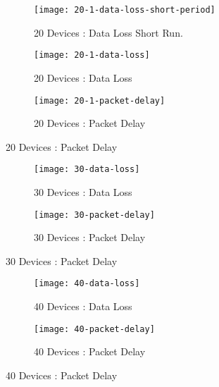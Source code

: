 \begin{center}
    \begin{figure}[p]
        \begin{subfigure}{1\textwidth}
            \centering
            \texttt{[image: 20-1-data-loss-short-period]}
            \caption{20 Devices : Data Loss Short Run.}
            \label{fig:20-D-DLSR}
        \end{subfigure}
        \begin{subfigure}{1\textwidth}
            \centering
            \texttt{[image: 20-1-data-loss]}
            \caption{20 Devices : Data Loss}
            \label{fig:20-D-DL}
        \end{subfigure}
        \begin{subfigure}{1\textwidth}
            \centering
            \texttt{[image: 20-1-packet-delay]}
            \caption{20 Devices : Packet Delay}
            \label{fig:20-D-PD}
        \end{subfigure}
    \end{figure}
    \begin{figure}[p]
        \begin{subfigure}{1\textwidth}
            \centering
            \texttt{[image: 30-data-loss]}
            \caption{30 Devices : Data Loss}
            \label{fig:30-D-DL}
        \end{subfigure}
        \begin{subfigure}{1\textwidth}
            \centering
            \texttt{[image: 30-packet-delay]}
            \caption{30 Devices : Packet Delay}
            \label{fig:30-D-PD}
        \end{subfigure}
    \end{figure}
    \begin{figure}[p]
        \begin{subfigure}{1\textwidth}
            \centering
            \texttt{[image: 40-data-loss]}
            \caption{40 Devices : Data Loss}
            \label{fig:40-D-DL}
        \end{subfigure}
        \begin{subfigure}{1\textwidth}
            \centering
            \texttt{[image: 40-packet-delay]}
            \caption{40 Devices : Packet Delay}
            \label{fig:40-D-PD}
        \end{subfigure}
    \end{figure}
\end{center}
